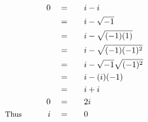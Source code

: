 \begin{alignat*}{5}
&\,&0\quad&=\quad&&i-i\\
&\,&\,&=&&i-\sqrt{-1}\\
&\,&\,&=&&i-\sqrt{(-1)(1)}\\
&\,&\,&=&&i-\sqrt{(-1)(-1)^2}\\
&\,&\,&=&&i-\sqrt{-1}\sqrt{(-1)^2}\\
&\,&\,&=&&i-(i)(-1)\\
&\,&\,&=&&i+i\\
&\,&0\quad&=&&2i\\
&\small\text{Thus}\normalsize\qquad&i\quad&=&&0\\
\end{alignat*}
